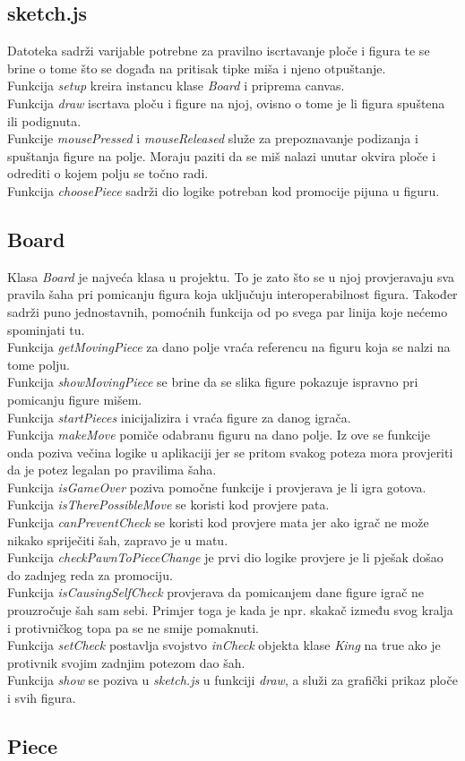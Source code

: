 \documentclass[11pt]{article}
\begin{document}
\subsection{sketch.js}
Datoteka sadrži varijable potrebne za pravilno iscrtavanje ploče i figura te se brine o tome što se događa na pritisak 
tipke miša i njeno otpuštanje.\\
Funkcija \textit{setup} kreira instancu klase \textit{Board} i priprema canvas.\\
Funkcija \textit{draw} iscrtava ploču i figure na njoj, ovisno o tome je li figura spuštena ili podignuta.\\
Funkcije \textit{mousePressed} i \textit{mouseReleased} služe za prepoznavanje podizanja i spuštanja figure na polje. Moraju paziti da
se miš nalazi unutar okvira ploče i odrediti o kojem polju se točno radi.\\
Funkcija \textit{choosePiece} sadrži dio logike potreban kod promocije pijuna u figuru.\\

\subsection{Board}
Klasa \textit{Board} je najveća klasa u projektu. To je zato što se u njoj provjeravaju sva pravila šaha pri pomicanju figura koja
uključuju interoperabilnost figura. Također sadrži puno jednostavnih, pomoćnih funkcija od po svega par linija koje nećemo spominjati tu.\\
Funkcija \textit{getMovingPiece} za dano polje vraća referencu na figuru koja se nalzi na tome polju.\\
Funkcija \textit{showMovingPiece} se brine da se slika figure pokazuje ispravno pri pomicanju figure mišem.\\
Funkcija \textit{startPieces} inicijalizira i vraća figure za danog igrača.\\
Funkcija \textit{makeMove} pomiče odabranu figuru na dano polje. Iz ove se funkcije onda poziva večina logike u aplikaciji jer se pritom svakog
poteza mora provjeriti da je potez legalan po pravilima šaha.\\  
Funkcija \textit{isGameOver} poziva pomočne funkcije i provjerava je li igra gotova.
Funkcija \textit{isTherePossibleMove} se koristi kod provjere pata.\\
Funkcija \textit{canPreventCheck} se koristi kod provjere mata jer ako igrač ne može nikako spriječiti šah, zapravo je u matu.\\
Funkcija \textit{checkPawnToPieceChange} je prvi dio logike provjere je li pješak došao do zadnjeg reda za promociju. \\
Funkcija \textit{isCausingSelfCheck} provjerava da pomicanjem dane figure igrač ne prouzročuje šah sam sebi. Primjer toga je kada je
npr. skakač između svog kralja i protivničkog topa pa se ne smije pomaknuti.\\
Funkcija \textit{setCheck} postavlja svojstvo \textit{inCheck} objekta klase \textit{King} na true ako je protivnik svojim zadnjim potezom
dao šah.\\
Funkcija \textit{show} se poziva u \textit{sketch.js} u funkciji \textit{draw}, a služi za grafički prikaz ploče i svih figura. 

\subsection{Piece}
\end{document}
